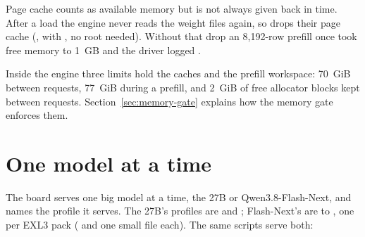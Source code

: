 Page cache counts as available memory but is not always given back in time. After a load the engine never reads the weight files again, so  drops their page cache (,  with , no root needed). Without that drop an 8,192-row prefill once took free memory to 1~GB and the driver logged .

Inside the engine three limits hold the caches and the prefill workspace: 70~GiB between requests, 77~GiB during a prefill, and 2~GiB of free allocator blocks kept between requests. Section~\ref{sec:memory-gate} explains how the memory gate enforces them.

\section{One model at a time}\label{sec:two-models}

The board serves one big model at a time, the 27B or Qwen3.8-Flash-Next, and  names the profile it serves. The 27B's profiles are  and ; Flash-Next's are  to , one per EXL3 pack ( and one small file each). The same scripts serve both:


